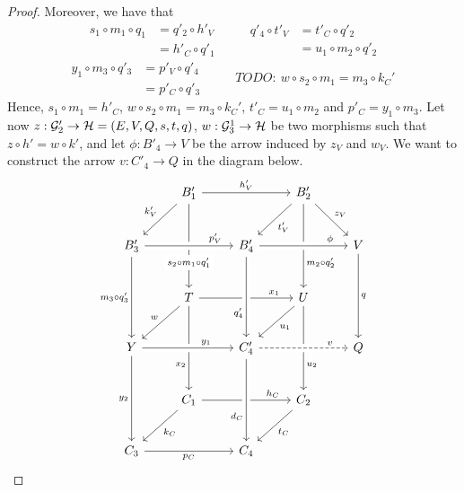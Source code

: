 \begin{proof}
	Moreover, we have that
	\[
		\begin{split}
			s_1 \circ m_1 \circ q_1 &= q'_2 \circ h'_V \\ &= h'_C \circ q'_1
		\end{split}\qquad\begin{split}
			q'_4 \circ t'_V &= t'_C \circ q'_2\\ &= u_1\circ m_2 \circ q'_2
		\end{split}
	\]\[
		\begin{split}
			y_1 \circ m_3 \circ q'_3 &= p'_V \circ q'_4\\ &= p'_C \circ q'_3
		\end{split}\qquad\begin{split}TODO:\ w \circ s_2 \circ m_1 = m_3 \circ k_C'
		\end{split}
	\]
	Hence, $s_1\circ m_1 = h'_C$, $w \circ s_2 \circ m_1 = m_3 \circ k_C'$, $t'_C = u_1 \circ m_2$ and $p'_C = y_1 \circ m_3$.
	Let now $z: \mathcal{G}'_2 \to \mathcal{H} = (E, V, Q, s, t, q)$, $w: \mathcal{G}_3^1 \to \mathcal{H}$ be two morphisms such that $z \circ h' = w \circ k'$, and let $\phi:B'_4 \to V$ be the arrow induced by $z_V$ and $w_V$. We want to construct the arrow $v: C'_4 \to Q$ in the diagram below.
	\[\begin{tikzcd}[row sep = 25, column sep = 25]
	& {B_1'} && {B_2'} \\
	{B_3'} && {B_4'} && V \\
	& T && U \\
	Y && {C_4'} && Q \\
	& {C_1} && {C_2} \\
	{C_3} && {C_4}
	\arrow["{h_V'}", from=1-2, to=1-4]
	\arrow["{k_V'}"', from=1-2, to=2-1]
	\arrow["{s_2\circ m_1 \circ q_1'}"{description, pos=0.7}, from=1-2, to=3-2]
	\arrow["{t_V'}", from=1-4, to=2-3]
	\arrow["{z_V}", from=1-4, to=2-5]
	\arrow["{m_2\circ q'_2}"{pos=0.7}, from=1-4, to=3-4]
	\arrow["{m_3 \circ q'_3}"', from=2-1, to=4-1]
	\arrow["q", from=2-5, to=4-5]
	\arrow["{x_1}"{pos=0.8}, from=3-2, to=3-4]
	\arrow["w"', from=3-2, to=4-1]
	\arrow["{x_2}"'{pos=0.7}, from=3-2, to=5-2]
	\arrow["{u_1}", from=3-4, to=4-3]
	\arrow["{u_2}"{pos=0.7}, from=3-4, to=5-4]
	\arrow["{y_2}"', from=4-1, to=6-1]
	\arrow["{h_C}"{pos=0.8}, from=5-2, to=5-4]
	\arrow["{k_C}", from=5-2, to=6-1]
	\arrow["{t_C}", from=5-4, to=6-3]
	\arrow["{p_C}"', from=6-1, to=6-3]
	\arrow["{p_V'}"{pos=0.8}, from=2-1, to=2-3, crossing over]
	\arrow["\phi"{pos=0.8}, from=2-3, to=2-5, crossing over]
	\arrow["{q'_4}"'{pos=0.7}, from=2-3, to=4-3, crossing over]
	\arrow["{y_1}"{pos=0.7}, from=4-1, to=4-3, crossing over]
	\arrow["{d_C}"'{pos=0.7}, from=4-3, to=6-3, crossing over]
	\arrow["v"{pos=0.8}, dashed, from=4-3, to=4-5, crossing over]
	\end{tikzcd}\]
	

\end{proof}
